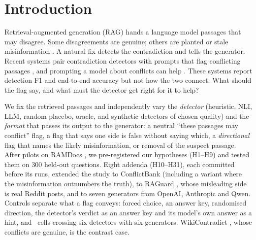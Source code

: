 \section{Introduction}

Retrieval-augmented generation (RAG) \citep{lewis2020rag} hands a language model passages that may disagree. Some
disagreements are genuine; others are planted or stale misinformation \citep{zou2025poisonedrag,wang2025madam}. A natural fix detects the contradiction and tells
the generator. Recent systems pair contradiction detectors with prompts that flag conflicting passages
\citep{wang2026conflictrag}, and prompting a model about conflicts can help \citep{cattan2025conflicts}. These systems
report detection F1 and end-to-end accuracy but not how the two connect. What should the flag say, and what must the
detector get right for it to help?

We fix the retrieved passages and independently vary the \emph{detector} (heuristic, NLI, LLM, random placebo,
oracle, and synthetic detectors of chosen quality) and the \emph{format} that passes its output to the generator: a
neutral ``these passages may conflict'' flag, a flag that says one side is false without saying which, a
\emph{directional} flag that names the likely misinformation, or removal of the suspect passage. After pilots on
RAMDocs \citep{wang2025madam}, we pre-registered our hypotheses (H1--H9) and tested them on 300 held-out questions.
Eight addenda (H10--H31), each committed before its runs, extended the study to ConflictBank \citep{su2024conflictbank}
(including a variant where the misinformation outnumbers the truth), to RAGuard \citep{zeng2025raguard}, whose
misleading side is real Reddit posts, and to seven generators from OpenAI, Anthropic and Qwen. Controls separate what a
flag conveys: forced choice, an answer key, randomised direction, the detector's verdict as an answer key and its model's own answer as
a hint, and \hTwentyFourCells\ cells crossing six detectors with six generators. WikiContradict \citep{hou2024wikicontradict}, whose conflicts are genuine, is the contrast case.

